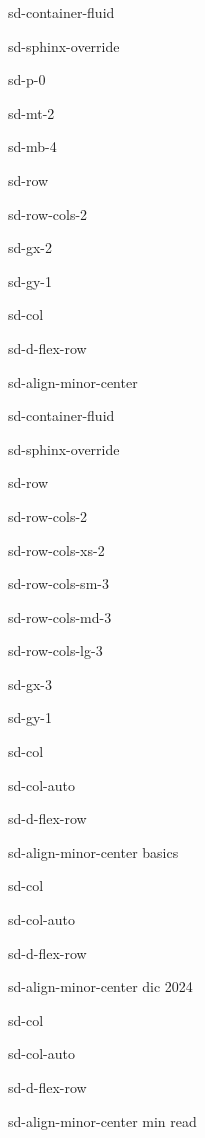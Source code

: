 \documentclass[letterpaper,10pt,italian]{jupyterBook}
\begin{document}
\begin{sphinxuseclass}{sd-container-fluid}
\begin{sphinxuseclass}{sd-sphinx-override}
\begin{sphinxuseclass}{sd-p-0}
\begin{sphinxuseclass}{sd-mt-2}
\begin{sphinxuseclass}{sd-mb-4}
\begin{sphinxuseclass}{sd-row}
\begin{sphinxuseclass}{sd-row-cols-2}
\begin{sphinxuseclass}{sd-gx-2}
\begin{sphinxuseclass}{sd-gy-1}
\begin{sphinxuseclass}{sd-col}
\begin{sphinxuseclass}{sd-d-flex-row}
\begin{sphinxuseclass}{sd-align-minor-center}
\begin{sphinxuseclass}{sd-container-fluid}
\begin{sphinxuseclass}{sd-sphinx-override}
\begin{sphinxuseclass}{sd-row}
\begin{sphinxuseclass}{sd-row-cols-2}
\begin{sphinxuseclass}{sd-row-cols-xs-2}
\begin{sphinxuseclass}{sd-row-cols-sm-3}
\begin{sphinxuseclass}{sd-row-cols-md-3}
\begin{sphinxuseclass}{sd-row-cols-lg-3}
\begin{sphinxuseclass}{sd-gx-3}
\begin{sphinxuseclass}{sd-gy-1}
\begin{sphinxuseclass}{sd-col}
\begin{sphinxuseclass}{sd-col-auto}
\begin{sphinxuseclass}{sd-d-flex-row}
\begin{sphinxuseclass}{sd-align-minor-center}
\sphinxAtStartPar
basics

\end{sphinxuseclass}
\end{sphinxuseclass}
\end{sphinxuseclass}
\end{sphinxuseclass}
\begin{sphinxuseclass}{sd-col}
\begin{sphinxuseclass}{sd-col-auto}
\begin{sphinxuseclass}{sd-d-flex-row}
\begin{sphinxuseclass}{sd-align-minor-center}
 dic 2024

\end{sphinxuseclass}
\end{sphinxuseclass}
\end{sphinxuseclass}
\end{sphinxuseclass}
\begin{sphinxuseclass}{sd-col}
\begin{sphinxuseclass}{sd-col-auto}
\begin{sphinxuseclass}{sd-d-flex-row}
\begin{sphinxuseclass}{sd-align-minor-center}
 min read


\end{sphinxuseclass}
\end{sphinxuseclass}
\end{sphinxuseclass}
\end{sphinxuseclass}
\end{sphinxuseclass}
\end{sphinxuseclass}
\end{sphinxuseclass}
\end{sphinxuseclass}
\end{sphinxuseclass}
\end{sphinxuseclass}
\end{sphinxuseclass}
\end{sphinxuseclass}
\end{sphinxuseclass}
\end{sphinxuseclass}
\end{sphinxuseclass}
\end{sphinxuseclass}
\end{sphinxuseclass}
\end{sphinxuseclass}
\end{sphinxuseclass}
\end{sphinxuseclass}
\end{sphinxuseclass}
\end{sphinxuseclass}
\end{sphinxuseclass}
\end{sphinxuseclass}
\end{sphinxuseclass}
\end{sphinxuseclass}
\end{document}
